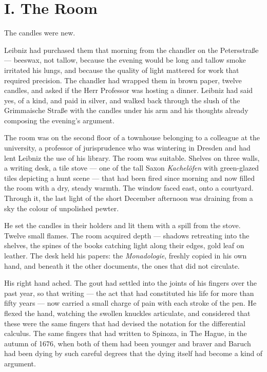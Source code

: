 \section*{I. The Room}

The candles were new.

Leibniz had purchased them that morning from the chandler on the Petersstra\ss e --- beeswax, not tallow, because the evening would be long and tallow smoke irritated his lungs, and because the quality of light mattered for work that required precision. The chandler had wrapped them in brown paper, twelve candles, and asked if the Herr Professor was hosting a dinner. Leibniz had said yes, of a kind, and paid in silver, and walked back through the slush of the Grimmaische Stra\ss e with the candles under his arm and his thoughts already composing the evening's argument.

The room was on the second floor of a townhouse belonging to a colleague at the university, a professor of jurisprudence who was wintering in Dresden and had lent Leibniz the use of his library. The room was suitable. Shelves on three walls, a writing desk, a tile stove --- one of the tall Saxon \emph{Kachel\"ofen} with green-glazed tiles depicting a hunt scene --- that had been fired since morning and now filled the room with a dry, steady warmth. The window faced east, onto a courtyard. Through it, the last light of the short December afternoon was draining from a sky the colour of unpolished pewter.

He set the candles in their holders and lit them with a spill from the stove. Twelve small flames. The room acquired depth --- shadows retreating into the shelves, the spines of the books catching light along their edges, gold leaf on leather. The desk held his papers: the \emph{Monadologie}, freshly copied in his own hand, and beneath it the other documents, the ones that did not circulate.

His right hand ached. The gout had settled into the joints of his fingers over the past year, so that writing --- the act that had constituted his life for more than fifty years --- now carried a small charge of pain with each stroke of the pen. He flexed the hand, watching the swollen knuckles articulate, and considered that these were the same fingers that had devised the notation for the differential calculus. The same fingers that had written to Spinoza, in The Hague, in the autumn of 1676, when both of them had been younger and braver and Baruch had been dying by such careful degrees that the dying itself had become a kind of argument.

